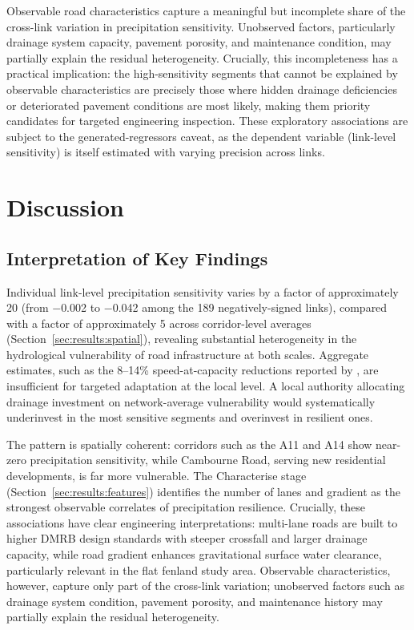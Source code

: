 \documentclass[review,authoryear]{elsarticle}
\begin{document}
Observable road characteristics capture a meaningful but incomplete share of the cross-link variation in precipitation sensitivity. Unobserved factors, particularly drainage system capacity, pavement porosity, and maintenance condition, may partially explain the residual heterogeneity. Crucially, this incompleteness has a practical implication: the high-sensitivity segments that cannot be explained by observable characteristics are precisely those where hidden drainage deficiencies or deteriorated pavement conditions are most likely, making them priority candidates for targeted engineering inspection. These exploratory associations are subject to the generated-regressors caveat, as the dependent variable (link-level sensitivity) is itself estimated with varying precision across links.


\section{Discussion}
\label{sec:discussion}

\subsection{Interpretation of Key Findings}
\label{sec:disc:findings}

Individual link-level precipitation sensitivity varies by a factor of approximately 20 (from $-$0.002 to $-$0.042 among the 189 negatively-signed links), compared with a factor of approximately 5 across corridor-level averages (Section~\ref{sec:results:spatial}), revealing substantial heterogeneity in the hydrological vulnerability of road infrastructure at both scales. Aggregate estimates, such as the 8--14\% speed-at-capacity reductions reported by \citet{hranac2006empirical}, are insufficient for targeted adaptation at the local level. A local authority allocating drainage investment on network-average vulnerability would systematically underinvest in the most sensitive segments and overinvest in resilient ones.

The pattern is spatially coherent: corridors such as the A11 and A14 show near-zero precipitation sensitivity, while Cambourne Road, serving new residential developments, is far more vulnerable. The Characterise stage (Section~\ref{sec:results:features}) identifies the number of lanes and gradient as the strongest observable correlates of precipitation resilience. Crucially, these associations have clear engineering interpretations: multi-lane roads are built to higher DMRB design standards with steeper crossfall and larger drainage capacity, while road gradient enhances gravitational surface water clearance, particularly relevant in the flat fenland study area. Observable characteristics, however, capture only part of the cross-link variation; unobserved factors such as drainage system condition, pavement porosity, and maintenance history may partially explain the residual heterogeneity.
\end{document}
